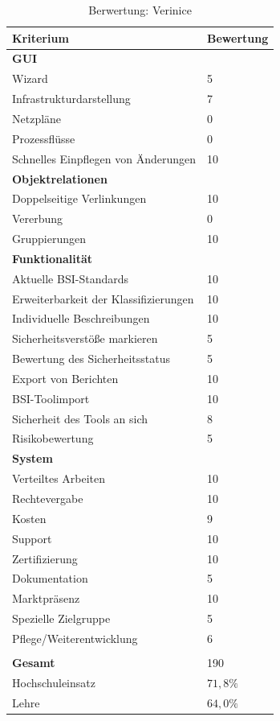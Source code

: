 \begin{table}[h]
\begin{tabular}{|p{}|p{}|}
\hline 
Kriterium & Bewertung\\ 
\hline 
\textbf{GUI}& \\
\hline
Wizard & 5\\
\hline 
Infrastrukturdarstellung & 7 \\
\hline 
Netzpläne & 0 \\
\hline 
Prozessflüsse & 0 \\
\hline 
Schnelles Einpflegen von Änderungen & 10 \\
\hline
\textbf{Objektrelationen} & \\
\hline 
Doppelseitige Verlinkungen & 10 \\
\hline 
Vererbung & 0 \\
\hline 
Gruppierungen & 10 \\
\hline 
\textbf{Funktionalität} &\\
\hline 
Aktuelle BSI-Standards & 10 \\
\hline  
Erweiterbarkeit der Klassifizierungen & 10 \\
\hline 
Individuelle Beschreibungen & 10 \\
\hline 
Sicherheitsverstöße markieren & 5 \\
\hline
Bewertung des Sicherheitsstatus & 5 \\
\hline
Export von Berichten & 10 \\
\hline
BSI-Toolimport & 10 \\
\hline
Sicherheit des Tools an sich & 8 \\
\hline
Risikobewertung & 5 \\
\hline
\textbf{System}&  \\
\hline
Verteiltes Arbeiten & 10 \\
\hline
Rechtevergabe & 10 \\
\hline
Kosten & 9 \\
\hline
Support & 10 \\
\hline
Zertifizierung & 10 \\
\hline
Dokumentation & 5 \\
\hline
Marktpräsenz & 10 \\
\hline
Spezielle Zielgruppe & 5 \\
\hline
Pflege/Weiterentwicklung & 6 \\
\hline
\multicolumn{2}{c}{}\\
\hline
\textbf{Gesamt} & 190\\
\hline
Hochschuleinsatz & $71,8\%$\\
\hline
Lehre & $64,0\%$\\
\hline
\end{tabular} 
\caption{Berwertung: Verinice}
\label{tab:BerwertungVerinice}
\end{table}







